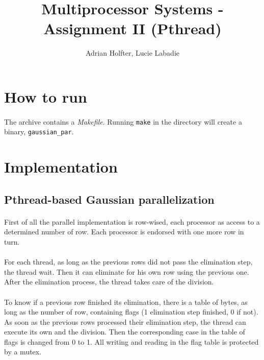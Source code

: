 \documentclass[]{article}
\title{Multiprocessor Systems - Assignment II (Pthread)}
\author{Adrian Holfter, Lucie Labadie}
\begin{document}
\maketitle

\section{How to run}

\paragraph{} The archive contains a \emph{Makefile}. Running \texttt{make} in the directory will create a binary, \texttt{gaussian\_par}.

\section{Implementation}

\subsection{Pthread-based Gaussian parallelization}

\paragraph{} First of all the parallel implementation is row-wised, each processor as access to a determined number of row. Each processor is endorsed with one more row in turn. 

\paragraph{} For each thread, as long as the previous rows did not pass the elimination step, the thread wait. Then it can eliminate for his own row using the previous one. After the elimination process, the thread takes care of the division. 

\paragraph{} To know if a previous row finished its elimination, there is a table of bytes, as long as the number of row, containing flags (1 elimination step finished, 0 if not). As soon as the previous rows processed their elimination step, the thread can execute its own and the division. Then the corresponding case in the table of flags is changed from 0 to 1. All writing and reading in the flag table is protected by a mutex. 
\end{document}
